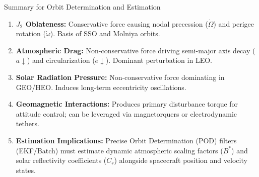 \documentclass[aspectratio=169,11pt]{beamer}
\begin{document}
\begin{frame}{Summary for Orbit Determination and Estimation}
    \begin{enumerate}
        \item \textbf{$J_2$ Oblateness:} Conservative force causing nodal precession ($\dot{\Omega}$) and perigee rotation ($\dot{\omega}$). Basis of SSO and Molniya orbits.
        \item \textbf{Atmospheric Drag:} Non-conservative force driving semi-major axis decay ($a\downarrow$) and circularization ($e\downarrow$). Dominant perturbation in LEO.
        \item \textbf{Solar Radiation Pressure:} Non-conservative force dominating in GEO/HEO. Induces long-term eccentricity oscillations.
        \item \textbf{Geomagnetic Interactions:} Produces primary disturbance torque for attitude control; can be leveraged via magnetorquers or electrodynamic tethers.
        \item \textbf{Estimation Implications:} Precise Orbit Determination (POD) filters (EKF/Batch) must estimate dynamic atmospheric scaling factors ($B^*$) and solar reflectivity coefficients ($C_r$) alongside spacecraft position and velocity states.
    \end{enumerate}
\end{frame}
\end{document}
